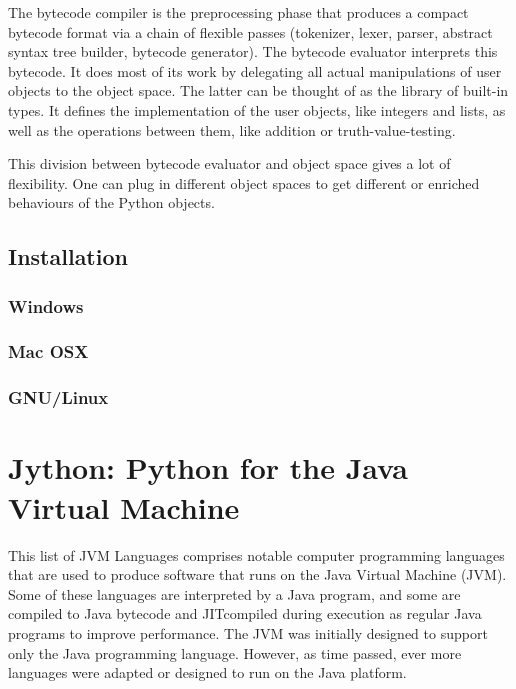 The bytecode compiler is the preprocessing phase that produces a compact bytecode format via a chain of flexible passes (tokenizer, lexer, parser, abstract syntax tree builder, bytecode generator). The bytecode evaluator interprets this bytecode. It does most of its work by delegating all actual manipulations of user objects to the object space. The latter can be thought of as the library of built-in types. It defines the implementation of the user objects, like integers and lists, as well as the operations between them, like addition or truth-value-testing.

This division between bytecode evaluator and object space gives a lot of flexibility. One can plug in different object spaces to get different or enriched behaviours of the Python objects.


\subsection{Installation}

\subsubsection{Windows}

\subsubsection{Mac OSX}

\subsubsection{GNU/Linux}



\newpage
\section{Jython: Python for the Java Virtual Machine}

This list of JVM Languages comprises notable computer
programming languages that are used to produce
software that runs on the Java Virtual Machine (JVM).
Some of these languages are interpreted by a Java program,
and some are compiled to Java bytecode and JITcompiled
during execution as regular Java programs to
improve performance.
The JVM was initially designed to support only the Java
programming language. However, as time passed, ever
more languages were adapted or designed to run on the
Java platform.


